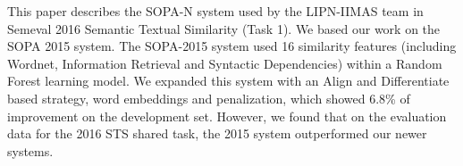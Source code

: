 This paper describes the SOPA-N system used by the LIPN-IIMAS team in Semeval 2016 Semantic Textual Similarity (Task 1). We based our work on the SOPA 2015 system. The SOPA-2015 system used 16 similarity features (including Wordnet, Information Retrieval and Syntactic Dependencies) within a Random Forest learning model. We expanded this system with an Align and Differentiate based strategy, word embeddings and penalization, which showed 6.8\% of improvement on the development set. However, we found that on the evaluation data for the 2016 STS shared task, the 2015 system outperformed  our newer systems.
